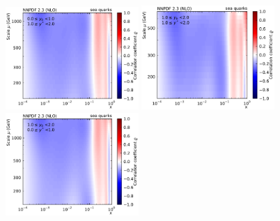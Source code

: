 \begin{figure}[htbp]
    \includegraphics[width=0.45\textwidth]{figures/pdf_constraints/corr_PTMAXEXPYS_YBYS_NLO_FINALBINS_NNPDF23_sea_quarks_ys1_0yb0_0_cl.pdf}\hfill
    \includegraphics[width=0.45\textwidth]{figures/pdf_constraints/corr_PTMAXEXPYS_YBYS_NLO_FINALBINS_NNPDF23_sea_quarks_ys1_0yb1_0_cl.pdf}\hfill
    \includegraphics[width=0.45\textwidth]{figures/pdf_constraints/corr_PTMAXEXPYS_YBYS_NLO_FINALBINS_NNPDF23_sea_quarks_ys0_0yb0_0_cl.pdf}\hfill
    \caption{}
    \label{fig:pdfconstraints_gluon}
\end{figure}

